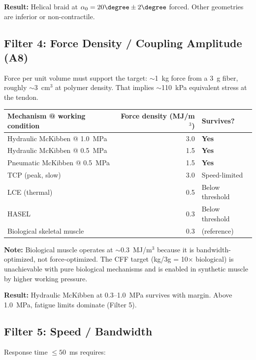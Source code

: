 \documentclass[11pt, a4paper]{article}
\begin{document}
\textbf{Result:} Helical braid at $\alpha_0 = 20\degree \pm 2\degree$
forced. Other geometries are inferior or non-contractile.

\subsection{Filter 4: Force Density / Coupling Amplitude (A8)}

Force per unit volume must support the target: $\sim$1~kg force
from a 3~g fiber, roughly $\sim$3~cm$^3$ at polymer density.
That implies $\sim$110~kPa equivalent stress at the tendon.

\begin{center}
\begin{tabular}{@{}lrl@{}}
\toprule
\textbf{Mechanism @ working condition} & \textbf{Force density (MJ/m$^3$)} &
  \textbf{Survives?} \\
\midrule
Hydraulic McKibben @ 1.0~MPa & 3.0 &
  \textcolor{nm-green}{\textbf{Yes}} \\
Hydraulic McKibben @ 0.5~MPa & 1.5 &
  \textcolor{nm-green}{\textbf{Yes}} \\
Pneumatic McKibben @ 0.5~MPa & 1.5 &
  \textcolor{nm-green}{\textbf{Yes}} \\
TCP (peak, slow) & 3.0 &
  \textcolor{nm-orange}{Speed-limited} \\
LCE (thermal) & 0.5 &
  \textcolor{nm-red}{Below threshold} \\
HASEL & 0.3 &
  \textcolor{nm-red}{Below threshold} \\
Biological skeletal muscle & 0.3 &
  (reference) \\
\bottomrule
\end{tabular}
\end{center}

\textbf{Note:} Biological muscle operates at $\sim$0.3~MJ/m$^3$
because it is bandwidth-optimized, not force-optimized. The CFF
target (kg/3g = 10$\times$ biological) is unachievable with pure
biological mechanisms and is enabled in synthetic muscle by
higher working pressure.

\textbf{Result:} Hydraulic McKibben at 0.3--1.0~MPa survives with
margin. Above 1.0~MPa, fatigue limits dominate (Filter 5).

\subsection{Filter 5: Speed / Bandwidth}

Response time $\leq 50$~ms requires:
\end{document}
